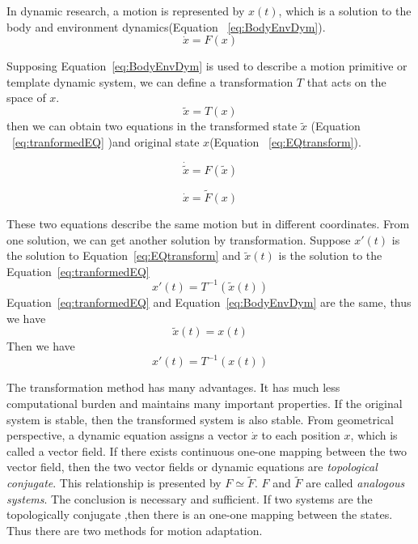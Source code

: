 In dynamic \cms research, a motion is represented by $x(t)$, which is a solution to the body and environment dynamics(Equation ~\ref{eq:BodyEnvDym}).
\begin{equation}
\dot{x}=F(x)
\label{eq:BodyEnvDym}
\end{equation}


Supposing Equation~\ref{eq:BodyEnvDym} is used to describe a motion primitive or template dynamic system,
 we can define a transformation $T$ that acts on the space of $x$.
\[
\tilde{x}=T(x)
\]
then we can obtain two equations in  the transformed state $\tilde{x}$ (Equation ~\ref{eq:tranformedEQ} )and original state $x$(Equation ~\ref{eq:EQtransform}).

\begin{equation}
\dot{\tilde{x}}=F(\tilde{x})
\label{eq:tranformedEQ}
\end{equation}

\begin{equation}
\dot{x}=\tilde{F}(x)
\label{eq:EQtransform}
\end{equation}

These two equations describe the same motion but in different coordinates.
From one solution, we can get another solution by transformation.
Suppose $x'(t)$ is the solution to Equation~\ref{eq:EQtransform} and $\tilde{x}(t)$ is the solution to the Equation~\ref{eq:tranformedEQ}
\[
x'(t)=T^{-1}(\tilde{x}(t))
\]
Equation~\ref{eq:tranformedEQ} and Equation~\ref{eq:BodyEnvDym} are the same, thus we have
\[
\tilde{x}(t)=x(t)
\]
Then we have
\[
x'(t)=T^{-1}(x(t))
\]




%
%
The  transformation method has many advantages.
It has much less computational burden and maintains many important properties.
If the original system is stable, then the transformed system is also stable.
%
%
From geometrical perspective, a dynamic equation assigns a vector $\dot{x}$ to each position $x$, which is called a vector field.
If there exists continuous one-one mapping between the two vector field, then the two vector fields  or dynamic equations are \emph{topological conjugate}.
This relationship is presented by $F \simeq \tilde{F}$.
$F$ and $\tilde{F}$ are called \emph{analogous systems}.
The conclusion is necessary and sufficient.
If two systems are the topologically conjugate ,then there is an one-one mapping between the states.
Thus there are two methods for motion adaptation.

